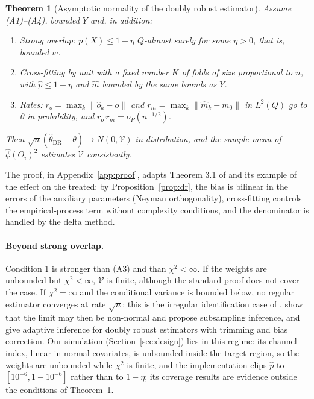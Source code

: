 \documentclass[11pt,a4paper]{article}
\theoremstyle{plain}
\newtheorem{theorem}{Theorem}
\theoremstyle{definition}
\begin{document}
\begin{theorem}[Asymptotic normality of the doubly robust estimator]\label{thm:normality}
Assume (A1)--(A4), bounded $Y$ and, in addition:
\begin{enumerate}
  \item \emph{Strong overlap:} $p(X)\le1-\eta$ $Q$-almost surely for some $\eta>0$, that is, bounded $w$.
  \item Cross-fitting by unit with a fixed number $K$ of folds of size proportional to $n$, with $\hat p\le1-\eta$ and $\hat m$ bounded by the same bounds as $Y$.
  \item \emph{Rates:} $r_o=\max_k\|\hat o_k-o\|$ and $r_m=\max_k\|\hat m_k-m_0\|$ in $L^2(Q)$ go to 0 in probability, and $r_o\,r_m=o_P(n^{-1/2})$.
\end{enumerate}
Then $\sqrt n(\hat\theta_{\mathrm{DR}}-\theta)\to N(0,\mathcal V)$ in distribution, and the sample mean of $\hat\phi(O_i)^2$ estimates $\mathcal V$ consistently.
\end{theorem}
The proof, in Appendix~\ref{app:proof}, adapts Theorem 3.1 of \citet{chernozhukov2018} and its example of the effect on the treated: by Proposition~\ref{prop:dr}, the bias is bilinear in the errors of the auxiliary parameters (Neyman orthogonality), cross-fitting controls the empirical-process term without complexity conditions, and the denominator is handled by the delta method.

\paragraph{Beyond strong overlap.} Condition 1 is stronger than (A3) and than $\chi^2<\infty$. If the weights are unbounded but $\chi^2<\infty$, $\mathcal V$ is finite, although the standard proof does not cover the case. If $\chi^2=\infty$ and the conditional variance is bounded below, no regular estimator converges at rate $\sqrt n$: this is the irregular identification case of \citet{khan2010}. \citet{ma2020} show that the limit may then be non-normal and propose subsampling inference, and \citet{ma2023} give adaptive inference for doubly robust estimators with trimming and bias correction. Our simulation (Section~\ref{sec:design}) lies in this regime: its channel index, linear in normal covariates, is unbounded inside the target region, so the weights are unbounded while $\chi^2$ is finite, and the implementation clips $\hat p$ to $[10^{-6},1-10^{-6}]$ rather than to $1-\eta$; its coverage results are evidence outside the conditions of Theorem~\ref{thm:normality}.
\end{document}

